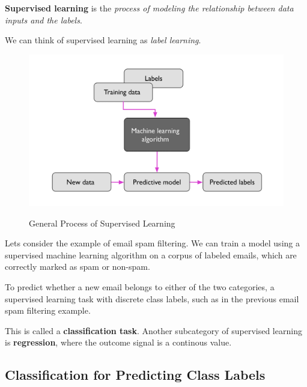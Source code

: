 \documentclass[../machine_learning_scikit.tex]{subfiles}
\begin{document}
    \begin{mydef}
        \textbf{Supervised learning} is the \textit{process of modeling the relationship between data inputs and the labels}.
    \end{mydef}

    We can think of supervised learning as \textit{label learning}.

    \begin{figure}[h]
        \begin{minipage}{\textwidth}
            \centering
            \includegraphics[scale=1]{images/supervised_learning_process.png} \\
            \caption{General Process of Supervised Learning}
            \label{figure:general_process_supervised_learning}
        \end{minipage}
    \end{figure}

    \begin{exa}
        Lets consider the example of email spam filtering. We can train a model using a supervised machine learning algorithm on a corpus of labeled emails, which are correctly marked as spam or non-spam.

        To predict whether a new email belongs to either of the two categories, a supervised learning task with discrete class labels, such as in the previous email spam filtering example.
        
        This is called a \textbf{classification task}. Another subcategory of supervised learning is \textbf{regression}, where the outcome signal is a continous value.
    \end{exa}

    \subsection{Classification for Predicting Class Labels}
\end{document}
